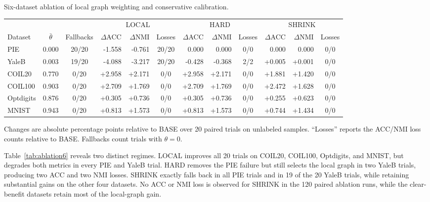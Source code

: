 \documentclass[11pt]{article}
\newenvironment{widetable}
  {\begin{strip}\centering\captionsetup{type=table}}
  {\end{strip}}
\theoremstyle{remark}
\begin{document}
\begin{widetable}
\centering
\caption{Six-dataset ablation of local graph weighting and conservative calibration.}
\label{tab:ablation6}
\scriptsize
\setlength{\tabcolsep}{10.2pt}
\begin{tabular}{lccrrcrrcrrc}
\toprule
& & & \multicolumn{3}{c}{LOCAL} & \multicolumn{3}{c}{HARD} & \multicolumn{3}{c}{SHRINK} \\
\cmidrule(lr){4-6}\cmidrule(lr){7-9}\cmidrule(lr){10-12}
Dataset & $\bar\theta$ & Fallbacks & $\Delta$ACC & $\Delta$NMI & Losses & $\Delta$ACC & $\Delta$NMI & Losses & $\Delta$ACC & $\Delta$NMI & Losses \\
\midrule
PIE & 0.000 & 20/20 & -1.558 & -0.761 & 20/20 & 0.000 & 0.000 & 0/0 & 0.000 & 0.000 & 0/0 \\
YaleB & 0.003 & 19/20 & -4.088 & -3.217 & 20/20 & -0.428 & -0.368 & 2/2 & +0.005 & +0.001 & 0/0 \\
COIL20 & 0.770 & 0/20 & +2.958 & +2.171 & 0/0 & +2.958 & +2.171 & 0/0 & +1.881 & +1.420 & 0/0 \\
COIL100 & 0.903 & 0/20 & +2.709 & +1.769 & 0/0 & +2.709 & +1.769 & 0/0 & +2.472 & +1.628 & 0/0 \\
Optdigits & 0.876 & 0/20 & +0.305 & +0.736 & 0/0 & +0.305 & +0.736 & 0/0 & +0.255 & +0.623 & 0/0 \\
MNIST & 0.943 & 0/20 & +0.813 & +1.573 & 0/0 & +0.813 & +1.573 & 0/0 & +0.744 & +1.434 & 0/0 \\
\bottomrule
\end{tabular}%

\vspace{1mm}
\parbox{0.98\linewidth}{\footnotesize Changes are absolute percentage points relative to BASE over 20 paired trials on unlabeled samples. ``Losses'' reports the ACC/NMI loss counts relative to BASE. Fallbacks count trials with $\theta=0$.}
\end{widetable}

Table~\ref{tab:ablation6} reveals two distinct regimes. LOCAL improves all 20 trials on COIL20, COIL100, Optdigits, and MNIST, but degrades both metrics in every PIE and YaleB trial. HARD removes the PIE failure but still selects the local graph in two YaleB trials, producing two ACC and two NMI losses. SHRINK exactly falls back in all PIE trials and in 19 of the 20 YaleB trials, while retaining substantial gains on the other four datasets. No ACC or NMI loss is observed for SHRINK in the 120 paired ablation runs, while the clear-benefit datasets retain most of the local-graph gain.
\end{document}
